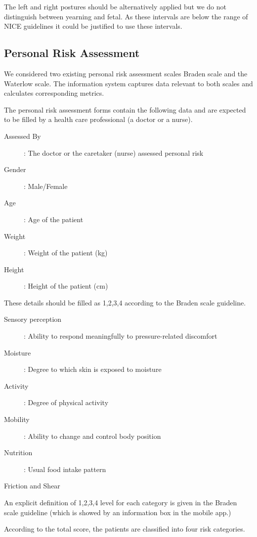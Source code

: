 The left and right postures should be alternatively applied but we do not distinguish between yearning and fetal. As these intervals are below the range of NICE guidelines it could be justified to use these intervals. 

\subsection{Personal Risk Assessment}

We considered two existing personal risk assessment scales Braden scale and the Waterlow scale. The information system captures data relevant to both scales and calculates corresponding metrics. 

The personal risk assessment forms contain the following data and are expected to be filled by a health care professional (a doctor or a nurse). 

\begin{description}
	\item[Assessed By]: The doctor or the caretaker (nurse) assessed personal risk
	\item[Gender]: Male/Female
	\item[Age]: Age of the patient
	\item[Weight]: Weight of the patient (kg)
	\item[Height]: Height of the patient (cm)    
\end{description}

These details should be filled as 1,2,3,4 according to the Braden scale guideline. 

\begin{description}
	\item[Sensory perception]: Ability to respond meaningfully to pressure-related discomfort 
	\item[Moisture]: Degree to which skin is exposed to moisture 
	\item[Activity]: Degree of physical	activity 
	\item[Mobility]: Ability to change and control body position
	\item[Nutrition]: Usual food intake 	pattern 
	\item[Friction and Shear]     
\end{description}

An explicit definition of 1,2,3,4 level for each category is given in the Braden scale guideline (which is showed by an information box in the mobile app.)

According to the total score, the patients are classified into four risk categories.


